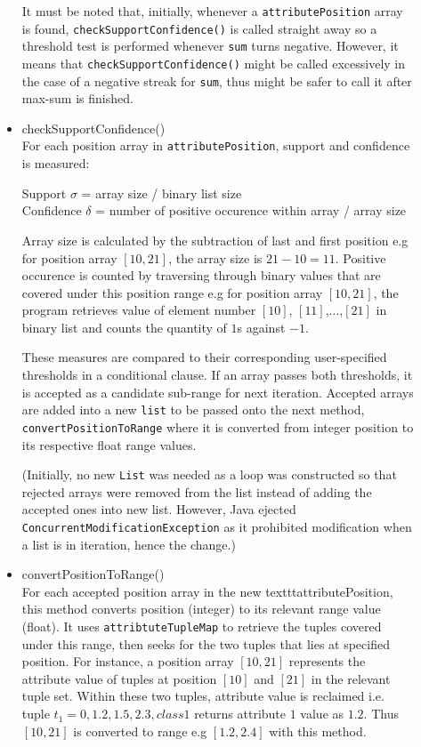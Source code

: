 \begin{description}
\begin{itemize}
	It must be noted that, initially, whenever a \texttt{attributePosition} array is found, \texttt{checkSupportConfidence()} is called straight away so a threshold test is performed whenever \texttt{sum} turns negative. However, it means that \texttt{checkSupportConfidence()} might be called excessively in the case of a negative streak for \texttt{sum}, thus might be safer to call it after max-sum is finished. 
	
	\item{checkSupportConfidence()} \\
	 For each position array in \texttt{attributePosition}, support and confidence is measured:
	  
	 Support $\sigma$ = array size / binary list size \\
	 Confidence $\delta$ = number of positive occurence within array / array size
	 
	 Array size is calculated by the subtraction of last and first position e.g for position array $[10,21]$, the array size is $21 - 10 = 11$. Positive occurence is counted by traversing through binary values that are covered under this position range e.g for position array $[10,21]$, the program retrieves value of element number $[10]$, $[11]$,...,$[21]$ in binary list and counts the quantity of $1$s against $-1$. 
	 
	 These measures are compared to their corresponding user-specified thresholds in a conditional clause. If an array passes both thresholds, it is accepted as a candidate sub-range for next iteration. Accepted arrays are added into a new \texttt{list} to be passed onto the next method, \texttt{convertPositionToRange} where it is converted from integer position to its respective float range values.
	 
	 (Initially, no new \texttt{List} was needed as a loop was constructed so that rejected arrays were removed from the list instead of adding the accepted ones into new list. However, Java ejected \texttt{ConcurrentModificationException} as it prohibited modification when a list is in iteration, hence the change.)
	
	\item{convertPositionToRange()} \\
	For each accepted position array in the new  texttt{attributePosition}, this method converts position (integer) to its relevant range value (float). It uses \texttt{attribtuteTupleMap} to retrieve the tuples covered under this range, then seeks for the two tuples that lies at specified position. For instance, a position array $[10,21]$ represents the attribute value of tuples at position $[10]$ and $[21]$ in the relevant tuple set. Within these two tuples, attribute value is reclaimed i.e. tuple $t_1 = {0, 1.2, 1.5, 2.3, class1}$ returns attribute $1$ value as $1.2$. Thus $[10,21]$ is converted to range e.g $[1.2, 2.4]$ with this method.
	

\end{itemize}
\end{description}
